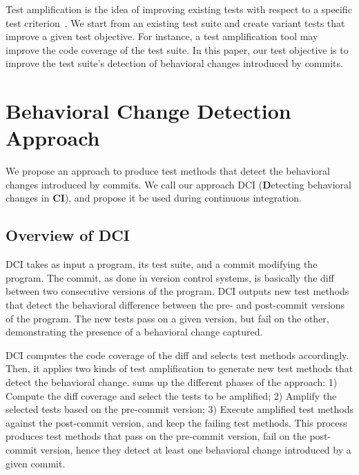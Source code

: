 Test amplification is the idea of improving existing tests with respect to a specific test criterion~\cite{zhang2012}.
We start from an existing test suite and create variant tests that improve a given test objective.
For instance, a test amplification tool may improve the code coverage of the test suite.
In this paper, our test objective is to improve the test suite's detection of behavioral changes introduced by commits.


\section{Behavioral Change Detection Approach}
\label{sec:techniques}

We propose an approach to produce test methods that detect the behavioral changes introduced by commits. 
We call our approach DCI (\textbf{D}etecting behavioral changes in \textbf{CI}), and propose it be used during continuous integration.

\subsection{Overview of DCI}
\label{subsec:global_overview}

DCI takes as input a program, its test suite, and a commit modifying the program.
The commit, as done in version control systems, is basically the diff between two consecutive versions of the program.
%
DCI outputs new test methods that detect the behavioral difference between the pre- and post-commit versions of the program.
The new tests pass on a given version, but fail on the other, demonstrating the presence of a behavioral change captured.%

DCI computes the code coverage of the diff and selects test methods accordingly. %
Then, it applies two kinds of test amplification to generate new test methods that detect the behavioral change.
%
 sums up the different phases of the approach:
1) Compute the diff coverage and select the tests to be amplified;
2) Amplify the selected tests based on the pre-commit version;
3) Execute amplified test methods against the post-commit version, and keep the failing test methods.
This process produces test methods that pass on the pre-commit version, fail on the post-commit version, hence they detect at least one behavioral change introduced by a given commit.


